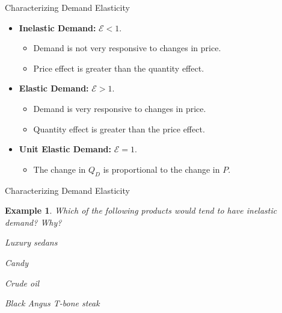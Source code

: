 \documentclass[xcolor={dvipsnames},pdf, hyperref={colorlinks=true, citecolor=ForestGreen, linkcolor=BlueViolet, urlcolor=Magenta}]{beamer}
\newtheorem{exmp}{Example}[section]
\newcommand{\defn}[1]{\textbf{#1}}
\newcommand{\ddp}[1]{{\textcolor{ForestGreen}{#1}}}
\begin{document}
\begin{frame}{Characterizing Demand Elasticity}
			\begin{itemize}
			\item 	\defn{Inelastic Demand:} $\mathcal{E} < 1$. 
			\begin{itemize}
				\item Demand is not very responsive to changes in price.
				\item Price effect is greater than the quantity effect.
			\end{itemize}
			
			
			\item \defn{Elastic Demand:} $\mathcal{E} > 1$. 
			\begin{itemize}
				\item Demand is very responsive to changes in price.
				\item Quantity effect is greater than the price effect.
			\end{itemize}
			
			
			\item 	\defn{Unit Elastic Demand:} $\mathcal{E} = 1$. 
			\begin{itemize}
			\item The change in $Q_D$ is proportional to the change in $P$.	
			\end{itemize}
				\end{itemize}
\end{frame}
	
\begin{frame}{Characterizing Demand Elasticity}
	
		\begin{exmp}
			
			Which of the following products would tend to have inelastic demand? Why?
			\begin{enumerate}[(a)]
				{\setlength\itemindent{25pt} \item Luxury sedans} 
				{\setlength\itemindent{25pt} \item Candy} 
				{\setlength\itemindent{25pt} \item Crude oil} 
				{\setlength\itemindent{25pt} \item Black Angus T-bone steak} 
			\end{enumerate}
		\end{exmp}
	\pause	\ddp{Option (c).}

\end{frame}
\end{document}
